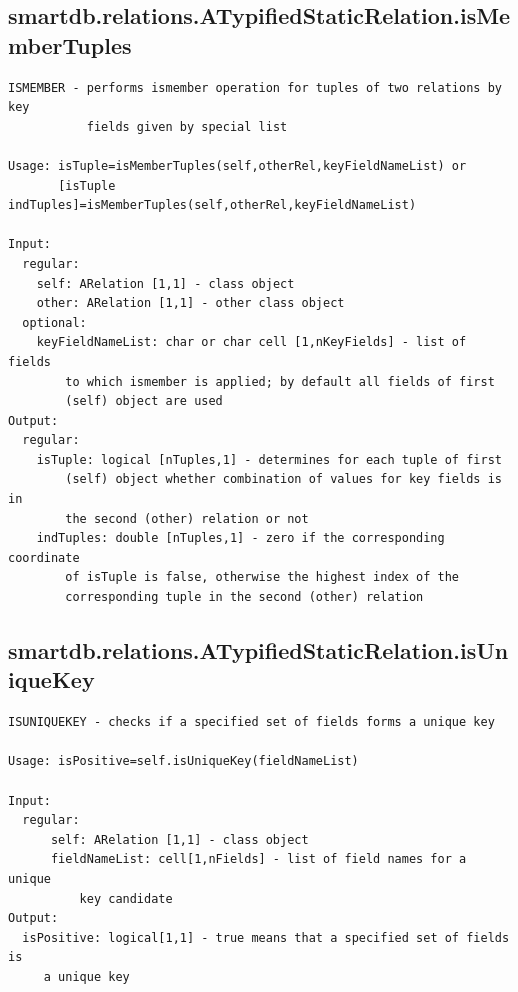 \documentclass[letterpaper,10pt,english]{sphinxmanual}
\begin{document}
\subsection{smartdb.relations.ATypifiedStaticRelation.isMemberTuples}
\label{chap_functions:smartdb-relations-atypifiedstaticrelation-ismembertuples}
\begin{Verbatim}[commandchars=\\\{\}]
ISMEMBER - performs ismember operation for tuples of two relations by key
           fields given by special list

Usage: isTuple=isMemberTuples(self,otherRel,keyFieldNameList) or
       [isTuple indTuples]=isMemberTuples(self,otherRel,keyFieldNameList)

Input:
  regular:
    self: ARelation [1,1] - class object
    other: ARelation [1,1] - other class object
  optional:
    keyFieldNameList: char or char cell [1,nKeyFields] - list of fields
        to which ismember is applied; by default all fields of first
        (self) object are used
Output:
  regular:
    isTuple: logical [nTuples,1] - determines for each tuple of first
        (self) object whether combination of values for key fields is in
        the second (other) relation or not
    indTuples: double [nTuples,1] - zero if the corresponding coordinate
        of isTuple is false, otherwise the highest index of the
        corresponding tuple in the second (other) relation
\end{Verbatim}


\subsection{smartdb.relations.ATypifiedStaticRelation.isUniqueKey}
\label{chap_functions:smartdb-relations-atypifiedstaticrelation-isuniquekey}
\begin{Verbatim}[commandchars=\\\{\}]
ISUNIQUEKEY - checks if a specified set of fields forms a unique key

Usage: isPositive=self.isUniqueKey(fieldNameList)

Input:
  regular:
      self: ARelation [1,1] - class object
      fieldNameList: cell[1,nFields] - list of field names for a unique
          key candidate
Output:
  isPositive: logical[1,1] - true means that a specified set of fields is
     a unique key
\end{Verbatim}
\end{document}
